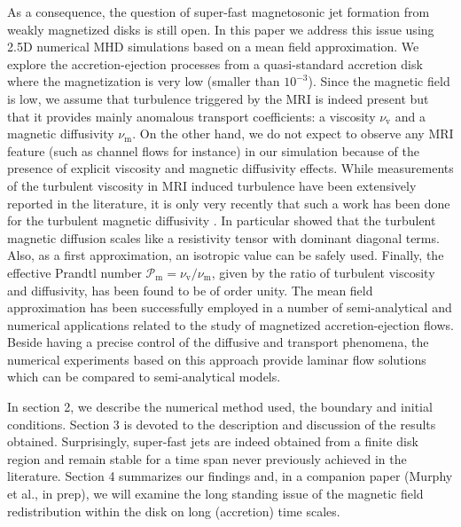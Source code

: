 \documentclass{aa}
\begin{document}
As a consequence, the question of super-fast magnetosonic jet formation from weakly magnetized disks is still open. In this paper we address this issue using 2.5D numerical MHD simulations
based on a mean field approximation. We explore the accretion-ejection processes from a quasi-standard accretion disk where the magnetization is very low (smaller than $10^{-3}$).
Since the magnetic field is low, we assume that turbulence triggered by the MRI is indeed present but that it provides mainly anomalous transport coefficients: a viscosity $\nu_\mathrm{v}$ and a magnetic 
diffusivity $\nu_\mathrm{m}$. On the other hand, we do not expect to observe any MRI feature (such as channel flows for instance) in our simulation because of the presence of explicit viscosity and magnetic 
diffusivity effects. While measurements of the turbulent viscosity in MRI induced turbulence have been extensively reported in the literature, it is only very recently that such a work has been done for the 
turbulent magnetic diffusivity \citep{Lesur:2009bf, Guan:2009gd}. In particular \citet{Lesur:2009bf} showed that the turbulent magnetic diffusion scales like a resistivity tensor with dominant diagonal 
terms. Also, as a first approximation, an isotropic value can be safely used. Finally, the effective Prandtl number $ \mathcal{P}_\mathrm{m} = \nu_\mathrm{v}/\nu_\mathrm{m}$, given by the ratio of turbulent viscosity and diffusivity, 
has been found to be of order unity.
The mean field approximation has been successfully employed in a number of semi-analytical \citep[e.g.][]{1995A&A...295..807F, 1995ApJ...444..848L, 2000A&A...353.1115C, 2001ApJ...553..158O, 
2008ApJ...677.1221R} and numerical applications \citep[e.g.][]{2002ApJ...581..988C, 2003ApJ...589..397K, 2003A&A...398..825V, 2006A&A...460....1M, 2007A&A...469..811Z, 2009MNRAS.399.1802R} 
related to the study of magnetized accretion-ejection flows. Beside having a precise control of the diffusive and transport phenomena, the numerical experiments based on this approach provide laminar flow 
solutions which can be compared to semi-analytical models.

In section 2, we describe the numerical method used, the boundary and initial conditions. Section 3 is devoted to the description and discussion of the results obtained. Surprisingly,
super-fast jets are indeed obtained from a finite disk region and remain stable for a time span never previously achieved in the literature. Section 4 summarizes our findings and, in a companion paper
(Murphy et al., in prep), we will examine the long standing issue of the magnetic field redistribution within the disk on long (accretion) time scales.
\end{document}
